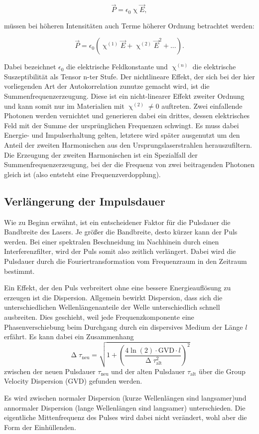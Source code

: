 \begin{equation}
    \vec P = \epsilon_0 \upchi \vec E,
\end{equation}

müssen bei höheren Intensitäten auch Terme höherer Ordnung betrachtet werden:

\begin{equation}
    \vec P = \epsilon_0 (\upchi ^{(1)}\vec E+\upchi ^{(2)}\vec E^2 +...).
\end{equation}

Dabei bezeichnet $\epsilon_0$ die elektrische Feldkonstante und $\upchi ^ {(n)}$ die elektrische Suszeptibilität als Tensor n-ter Stufe.
Der nichtlineare Effekt, der sich bei der hier vorliegenden Art der Autokorrelation zunutze gemacht wird,
ist die Summenfrequenzerzeugung. Diese ist ein nicht-linearer Effekt zweiter Ordnung und kann somit nur im Materialien mit $\upchi ^ {(2)}\neq 0$ auftreten.
Zwei einfallende Photonen werden vernichtet und generieren dabei ein drittes, dessen elektrisches Feld mit der 
Summe der ursprünglichen Frequenzen schwingt. 
Es muss dabei Energie- und Impulserhaltung gelten, letztere wird später ausgenutzt um den Anteil der zweiten Harmonischen aus den Ursprungslaserstrahlen herauszufiltern.
Die Erzeugung der zweiten Harmonischen ist ein Spezialfall der Summenfrequenzerzeugung, bei der die Frequenz von zwei beitragenden Photonen gleich ist (also entsteht eine Frequenzverdopplung).



\subsection{Verlängerung der Impulsdauer}
Wie zu Beginn erwähnt, ist ein entscheidener Faktor für die Pulsdauer die Bandbreite des Lasers.
Je größer die Bandbreite, desto kürzer kann der Puls werden.
Bei einer spektralen Beschneidung im Nachhinein durch einen Interferenzfilter, wird
der Puls somit also zeitlich verlängert. 
Dabei wird die Pulsdauer durch die Fouriertransformation vom Frequenzraum in den Zeitraum bestimmt.


Ein Effekt, der den Puls verbreitert ohne eine bessere Energieauflösung zu erzeugen ist die Dispersion.
Allgemein bewirkt Dispersion, dass sich die unterschiedlichen Wellenlängenanteile der Welle unterschiedlich schnell ausbreiten.
Dies geschieht, weil jede Frequenzkomponente eine Phasenverschiebung beim Durchgang
durch ein dispersives Medium der Länge $l$ erfährt.
Es kann dabei ein Zusammenhang 
\begin{equation}
    \upDelta \tau_{\text{neu}}= \sqrt{1+\left(\frac{4 \ln(2) \cdot \mathrm{GVD} \cdot l}{\upDelta \tau ^2_{\text{alt}}}\right)^2}
    \label{eqn:GVD}
\end{equation}
zwischen der neuen Pulsdauer $\tau_{\text{neu}}$ und der alten Pulsdauer $\tau_{\text{alt}}$ über die Group Velocity Dispersion (GVD)
gefunden werden.


Es wird zwischen normaler Dispersion (kurze Wellenlängen sind langsamer)und annormaler Dispersion (lange Wellenlängen sind langsamer) unterschieden.
Die eigentliche Mittenfrequenz des Pulses wird dabei nicht verändert, wohl aber die Form der Einhüllenden.

